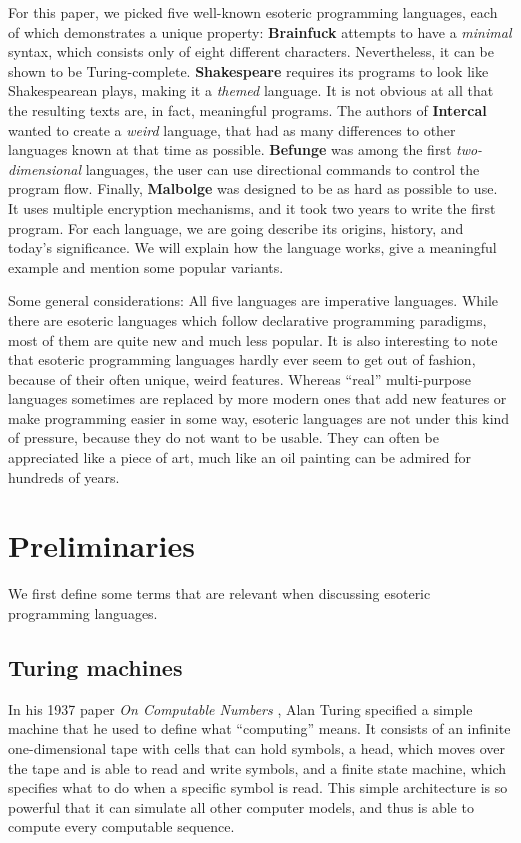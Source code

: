 \documentclass{sig-alternate}
\begin{document}
For this paper, we picked five well-known esoteric programming languages, each of which demonstrates a unique property: \textbf{Brainfuck} attempts to have a \textit{minimal} syntax, which consists only of eight different characters. Nevertheless, it can be shown to be Turing-complete. \textbf{Shakespeare} requires its programs to look like Shakespearean plays, making it a \textit{themed} language. It is not obvious at all that the resulting texts are, in fact, meaningful programs. The authors of \textbf{Intercal} wanted to create a \textit{weird} language, that had as many differences to other languages known at that time as possible. \textbf{Befunge} was among the first \textit{two-dimensional} languages, the user can use directional commands to control the program flow. Finally, \textbf{Malbolge} was designed to be as hard as possible to use. It uses multiple encryption mechanisms, and it took two years to write the first program. For each language, we are going describe its origins, history, and today's significance. We will explain how the language works, give a meaningful example and mention some popular variants.

Some general considerations: All five languages are imperative languages. While there are esoteric languages which follow declarative programming paradigms, most of them are quite new and much less popular. It is also interesting to note that esoteric programming languages hardly ever seem to get out of fashion, because of their often unique, weird features. Whereas “real” multi-purpose languages sometimes are replaced by more modern ones that add new features or make programming easier in some way, esoteric languages are not under this kind of pressure, because they do not want to be usable. They can often be appreciated like a piece of art, much like an oil painting can be admired for hundreds of years.

\section{Preliminaries}

We first define some terms that are relevant when discussing esoteric programming languages.

\subsection{Turing machines}

In his 1937 paper \emph{On Computable Numbers} \cite{turing1937computable}, Alan Turing specified a simple machine that he used to define what “computing” means. It consists of an infinite one-dimensional tape with cells that can hold symbols, a head, which moves over the tape and is able to read and write symbols, and a finite state machine, which specifies what to do when a specific symbol is read. This simple architecture is so powerful that it can simulate all other computer models, and thus is able to compute every computable sequence.
\end{document}
